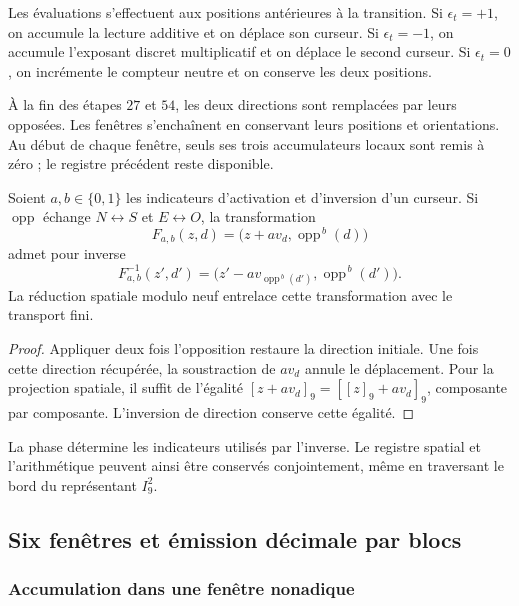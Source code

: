 Les évaluations s'effectuent aux positions antérieures à la transition.
Si \(\epsilon_t=+1\), on accumule la lecture additive et on déplace son curseur.
Si \(\epsilon_t=-1\), on accumule l'exposant discret multiplicatif et on
déplace le second curseur. Si \(\epsilon_t=0\), on incrémente le compteur
neutre et on conserve les deux positions.

À la fin des étapes \(27\) et \(54\), les deux directions sont remplacées
par leurs opposées. Les fenêtres s'enchaînent en conservant leurs positions et
orientations. Au début de chaque fenêtre, seuls ses trois accumulateurs locaux sont remis à zéro ; le registre précédent reste disponible.

\begin{proposition}
\label{act21:tpk:inversion}
Soient \(a,b\in\{0,1\}\) les indicateurs d'activation et d'inversion d'un
curseur. Si \(\operatorname{opp}\) échange \(N\leftrightarrow S\) et
\(E\leftrightarrow O\), la transformation
\[
 F_{a,b}(z,d)=\bigl(z+a v_d,\operatorname{opp}^{\,b}(d)\bigr)
\]
admet pour inverse
\[
 F_{a,b}^{-1}(z',d')=
 \bigl(z'-a v_{\operatorname{opp}^{\,b}(d')},
       \operatorname{opp}^{\,b}(d')\bigr).
\]
La réduction spatiale modulo neuf entrelace cette transformation avec le
transport fini.
\end{proposition}
\begin{proof}
Appliquer deux fois l'opposition restaure la direction initiale. Une fois
cette direction récupérée, la soustraction de \(a v_d\) annule le déplacement.
Pour la projection spatiale, il suffit de l'égalité
\([z+a v_d]_9=[[z]_9+a v_d]_9\), composante par composante. L'inversion de
direction conserve cette égalité.
\end{proof}

La phase détermine les indicateurs utilisés par l'inverse. Le registre
spatial et l'arithmétique peuvent ainsi être conservés conjointement, même en
traversant le bord du représentant \(I_9^2\).

\subsection{Six fenêtres et émission décimale par blocs}
\label{act21:tpk:emision}

\subsubsection{Accumulation dans une fenêtre nonadique}

